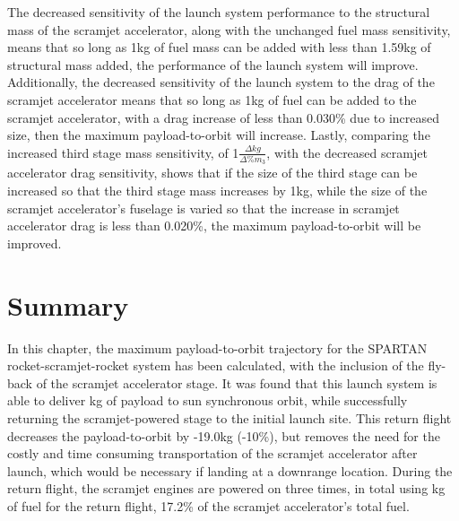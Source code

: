 The decreased sensitivity of the launch system performance to the structural mass of the scramjet accelerator, along with the unchanged fuel mass sensitivity, means that so long as 1kg of fuel mass can be added with less than 1.59kg of structural mass added, the performance of the launch system will improve. Additionally, the decreased sensitivity of the launch system to the drag of the scramjet accelerator means that so long as 1kg of fuel can be added to the scramjet accelerator, with a drag increase of less than 0.030\% due to increased size, then the maximum payload-to-orbit will increase. 
Lastly, comparing the increased third stage mass sensitivity, of 1$\frac{\Delta kg}{\Delta\%m_{3}}$, with the decreased scramjet accelerator drag sensitivity, shows that if the size of the third stage can be increased so that the third stage mass increases by 1kg, while the size of the scramjet accelerator's fuselage is varied so that the increase in scramjet accelerator drag is less than 0.020\%, the maximum payload-to-orbit will be improved. 





\section{Summary}

In this chapter, the maximum payload-to-orbit trajectory for the SPARTAN rocket-scramjet-rocket system has been calculated, with the inclusion of the fly-back of the scramjet accelerator stage. It was found that this launch system is able to deliver \PayloadToOrbitStandard kg of payload to sun synchronous orbit, while successfully returning the scramjet-powered stage to the initial launch site. 
This return flight decreases the payload-to-orbit by -19.0kg (-10\%), but removes the need for the costly and time consuming transportation of the scramjet accelerator after launch, which would be necessary if landing at a downrange location.
During the return flight, the scramjet engines are powered on three times, in total using \returnFuelStandard kg of fuel for the return flight, 17.2\% of the scramjet accelerator's total fuel.

